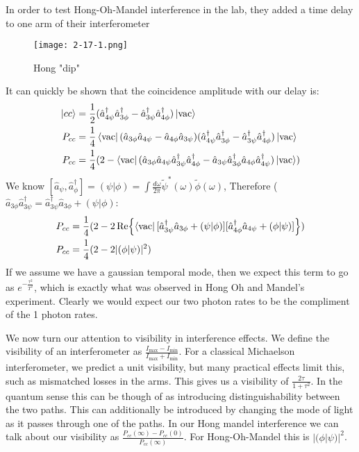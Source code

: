 In order to test Hong-Oh-Mandel interference in the lab, they added a time delay to one arm of their interferometer
\begin{figure*}[h]
	\centering
	\texttt{[image: 2-17-1.png]}
	\caption*{Hong "dip"}
\end{figure*}
It can quickly be shown that the coincidence amplitude with our delay is:
\begin{align*}
	\ket{cc} &= \frac{1}{2}(\hat{a}_{4\psi}^\dagger\hat{a}_{3\phi}^\dagger -\hat{a}_{3\psi}^\dagger\hat{a}_{4\phi}^\dagger)\ket{\text{vac}} \\
	P_{cc} &= \frac{1}{4} \bra{\text{vac}}(\hat{a}_{3\phi}\hat{a}_{4\psi} -\hat{a}_{4\phi}\hat{a}_{3\psi})(\hat{a}_{4\psi}^\dagger\hat{a}_{3\phi}^\dagger -\hat{a}_{3\psi}^\dagger\hat{a}_{4\phi}^\dagger)\ket{\text{vac}} \\
	P_{cc} &= \frac{1}{4} (2 - \bra{\text{vac}}(\hat{a}_{3\phi}\hat{a}_{4\psi}\hat{a}_{3\psi}^\dagger\hat{a}_{4\phi}^\dagger - \hat{a}_{3\psi}\hat{a}_{3\phi}^\dagger\hat{a}_{4\phi}\hat{a}_{4\psi}^\dagger)\ket{\text{vac}})
\end{align*}
We know $[\hat{a}_\psi,\hat{a}_\phi^\dagger] = (\psi|\phi) = \int \frac{d\omega}{2\pi} \tilde{\psi}^*(\omega)\tilde{\phi}(\omega)$, Therefore ($\hat{a}_{3\phi}\hat{a}_{3\psi}^\dagger = \hat{a}_{3\psi}^\dagger\hat{a}_{3\phi} + (\psi|\phi)$:
\begin{align*}
	P_{cc} &= \frac{1}{4} (2 - 2\Re{\bra{\text{vac}} [\hat{a}_{3\psi}^\dagger\hat{a}_{3\phi} + (\psi|\phi)][\hat{a}_{4\phi}^\dagger\hat{a}_{4\psi} + (\phi|\psi)]}) \\
	P_{cc} &= \frac{1}{4} (2 - 2|(\phi|\psi)|^2)
\end{align*}
If we assume we have a gaussian temporal mode, then we expect this term to go as $e^{-\frac{\tau^2}{T^2}}$, which is exactly what was observed in Hong Oh and Mandel's experiment. Clearly we would expect our two photon rates to be the compliment of the 1 photon rates.

We now turn our attention to visibility in interference effects. We define the visibility of an interferometer as $\frac{I_\text{max} - I_\text{min}}{I_\text{max} + I_\text{min}}$.
For a classical Michaelson interferometer, we predict a unit visibility, but many practical effects limit this, such as mismatched losses in the arms. This gives us a visibility of $\frac{2\tau}{1+\tau^2}$.
In the quantum sense this can be though of as introducing distinguishability between the two paths. This can additionally be introduced by changing the mode of light as it passes through one of the paths.
In our Hong mandel interference we can talk about our visibility as $\frac{P_{cc}(\infty) - P_{cc}(0)}{P_{cc}(\infty)}$. For Hong-Oh-Mandel this is $|(\phi|\psi)|^2$.


